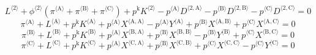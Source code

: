 \begin{equation}
{L}^{\langle \mathrm{2}\rangle} + {{\phi}^{\langle \mathrm{\mathrm{2}}\rangle}} \left({\pi}^{\langle \mathrm{A}\rangle} + {\pi}^{\langle \mathrm{B}\rangle} + {\pi}^{\langle \mathrm{C}\rangle}\right) + {p^{\mathrm{k}}} {{K}^{\langle \mathrm{2}\rangle}} - {{p}^{\langle \mathrm{A}\rangle}} {{D}^{\langle \mathrm{2},\mathrm{A}\rangle}} - {{p}^{\langle \mathrm{B}\rangle}} {{D}^{\langle \mathrm{2},\mathrm{B}\rangle}} - {{p}^{\langle \mathrm{C}\rangle}} {{D}^{\langle \mathrm{2},\mathrm{C}\rangle}} = 0
\end{equation}
\begin{equation}
{\pi}^{\langle \mathrm{A}\rangle} + {L}^{\langle \mathrm{A}\rangle} + {p^{\mathrm{k}}} {{K}^{\langle \mathrm{A}\rangle}} + {{p}^{\langle \mathrm{A}\rangle}} {{X}^{\langle \mathrm{A},\mathrm{A}\rangle}} - {{p}^{\langle \mathrm{A}\rangle}} {{Y}^{\langle \mathrm{A}\rangle}} + {{p}^{\langle \mathrm{B}\rangle}} {{X}^{\langle \mathrm{A},\mathrm{B}\rangle}} + {{p}^{\langle \mathrm{C}\rangle}} {{X}^{\langle \mathrm{A},\mathrm{C}\rangle}} = 0
\end{equation}
\begin{equation}
{\pi}^{\langle \mathrm{B}\rangle} + {L}^{\langle \mathrm{B}\rangle} + {p^{\mathrm{k}}} {{K}^{\langle \mathrm{B}\rangle}} + {{p}^{\langle \mathrm{A}\rangle}} {{X}^{\langle \mathrm{B},\mathrm{A}\rangle}} + {{p}^{\langle \mathrm{B}\rangle}} {{X}^{\langle \mathrm{B},\mathrm{B}\rangle}} - {{p}^{\langle \mathrm{B}\rangle}} {{Y}^{\langle \mathrm{B}\rangle}} + {{p}^{\langle \mathrm{C}\rangle}} {{X}^{\langle \mathrm{B},\mathrm{C}\rangle}} = 0
\end{equation}
\begin{equation}
{\pi}^{\langle \mathrm{C}\rangle} + {L}^{\langle \mathrm{C}\rangle} + {p^{\mathrm{k}}} {{K}^{\langle \mathrm{C}\rangle}} + {{p}^{\langle \mathrm{A}\rangle}} {{X}^{\langle \mathrm{C},\mathrm{A}\rangle}} + {{p}^{\langle \mathrm{B}\rangle}} {{X}^{\langle \mathrm{C},\mathrm{B}\rangle}} + {{p}^{\langle \mathrm{C}\rangle}} {{X}^{\langle \mathrm{C},\mathrm{C}\rangle}} - {{p}^{\langle \mathrm{C}\rangle}} {{Y}^{\langle \mathrm{C}\rangle}} = 0
\end{equation}








